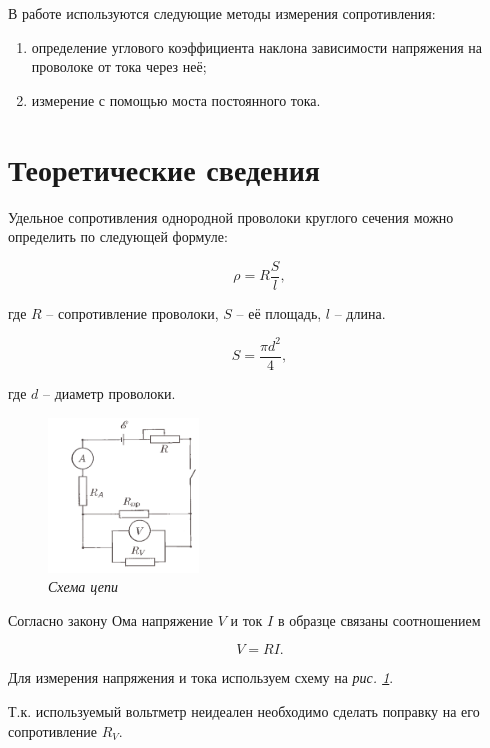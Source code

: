 \documentclass[a4paper,12pt]{article} %
\begin{document}
В работе используются следующие методы измерения сопротивления:
\begin{enumerate}
	\item определение углового коэффициента наклона зависимости напряжения на проволоке от тока через неё;
	\item измерение с помощью моста постоянного тока.
\end{enumerate}

\section{Теоретические сведения}

Удельное сопротивления однородной проволоки круглого сечения можно определить по следующей формуле:

\begin{equation}\label{1form}
\rho = R \frac{S}{l},
\end{equation}

\noindent где $R$ -- сопротивление проволоки, $S$ -- её площадь, $l$ -- длина.

\begin{equation}\label{1form}
S = \frac{\pi d^2}{4},
\end{equation}

\noindent где $d$ -- диаметр проволоки.

\medskip

\begin{figure}
	\includegraphics[width=4cm]{scheme.png}
	\caption{\textit{Схема цепи}}
	\label{fig:image}
\end{figure}

Согласно закону Ома напряжение $V$ и ток $I$ в образце связаны соотношением

\begin{equation}
V = RI.
\end{equation}

Для измерения напряжения и тока используем схему на \textit{рис.  \ref{fig:image}}.

\medskip

Т.к. используемый вольтметр неидеален необходимо сделать поправку на его сопротивление $R_V$.
\end{document}

